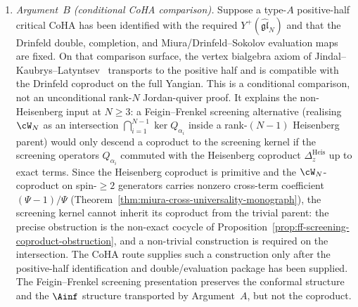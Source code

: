\begin{theorem}
\begin{enumerate}[label=\textup{(\alph*)}]
{ ordered Koszul locus\textup{)}.}
 At generic~$\Psi$, the algebra $\cW_N[\Psi]$ lies on the
 ordered Koszul locus
 \textup{(}Definition~\textup{\ref{def:ordered-koszul-locus}}\textup{)}.
The bar-cobar adjunction
$\Omega(\Barord(\cW_N[\Psi]))
\xrightarrow{\;\sim\;} \cW_N[\Psi]$
is an equivalence, and the coderivation property
 $\Delta \circ d_{\Barord}
 = (d_{\Barord}\otimes\id+\id\otimes d_{\Barord})\circ\Delta$
on $\Barord(\cW_N[\Psi]) = T^c(s^{-1}\overline{\cW}_N[\Psi])$
dualizes to OPE
compatibility~\eqref{eq:ope-compat} at all spins
 simultaneously
 \textup{(}Theorem~\textup{\ref{thm:chiral-qg-equiv}},
 direction $\textup{(II)} \to \textup{(III)}$\textup{)}.
 Uniqueness on the ordered Koszul locus identifies this bar-cobar
 coproduct with the Drinfeld
 coproduct~\eqref{eq:glN-drinfeld-coprod}.
\item \emph{Argument~$B$ \textup{(}conditional CoHA comparison\textup{)}.}
Suppose a type-$A$ positive-half critical CoHA has been
identified with the required
$Y^+(\widehat{\mathfrak{gl}}_N)$ and that the Drinfeld double,
completion, and Miura/Drinfeld--Sokolov evaluation maps are fixed.
On that comparison surface, the vertex bialgebra axiom of
Jindal--Kaubrys--Latyntsev~\textup{\cite{JKL26}} transports to the
positive half and is compatible with the Drinfeld coproduct on the
full Yangian. This is a conditional comparison, not an unconditional
rank-$N$ Jordan-quiver proof. It explains the non-Heisenberg input
at $N \geq 3$: a Feigin--Frenkel
screening alternative (realising $\cW_N$ as an intersection
 $\bigcap_{i=1}^{N-1}\ker Q_{\alpha_i}$ inside a rank-$(N-1)$
 Heisenberg parent) would only descend a coproduct to the
 screening kernel if the screening operators $Q_{\alpha_i}$
 commuted with the Heisenberg coproduct $\Delta_z^{\mathrm{Heis}}$
 up to exact terms. Since the Heisenberg coproduct is primitive
 and the $\cW_N$-coproduct on spin-$\geq 2$ generators carries
 nonzero cross-term coefficient $(\Psi-1)/\Psi$
 \textup{(}Theorem~\textup{\ref{thm:miura-cross-universality-monograph}}\textup{)},
 the screening kernel cannot inherit its coproduct from the
 trivial parent: the precise obstruction is the non-exact
 cocycle of
 Proposition~\ref{prop:ff-screening-coproduct-obstruction},
 and a non-trivial construction is required on the
 intersection. The CoHA route supplies such a construction only
 after the positive-half identification and double/evaluation
 package has been supplied. The
 Feigin--Frenkel screening presentation preserves the conformal
 structure and the $\Ainf$ structure transported by Argument~$A$,
 but not the coproduct.
\end{enumerate}
\end{theorem}

